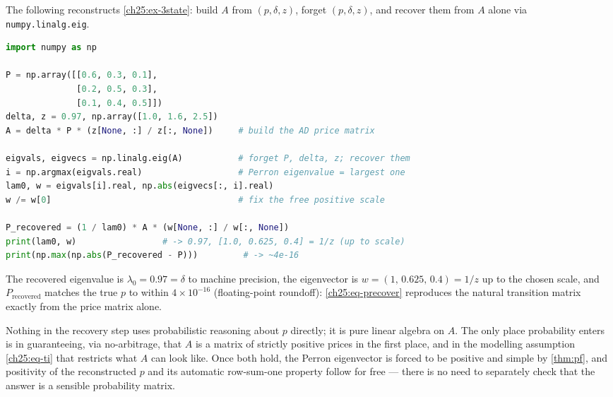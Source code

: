 \begin{paracol}{2}
\begin{casestudy}
The following reconstructs \cref{ch25:ex-3state}: build $A$ from $(p,\delta,z)$, forget $(p,\delta,z)$, and
recover them from $A$ alone via \texttt{numpy.linalg.eig}.
\begin{lstlisting}[language=Python]
import numpy as np

P = np.array([[0.6, 0.3, 0.1],
              [0.2, 0.5, 0.3],
              [0.1, 0.4, 0.5]])
delta, z = 0.97, np.array([1.0, 1.6, 2.5])
A = delta * P * (z[None, :] / z[:, None])     # build the AD price matrix

eigvals, eigvecs = np.linalg.eig(A)           # forget P, delta, z; recover them
i = np.argmax(eigvals.real)                   # Perron eigenvalue = largest one
lam0, w = eigvals[i].real, np.abs(eigvecs[:, i].real)
w /= w[0]                                     # fix the free positive scale

P_recovered = (1 / lam0) * A * (w[None, :] / w[:, None])
print(lam0, w)                 # -> 0.97, [1.0, 0.625, 0.4] = 1/z (up to scale)
print(np.max(np.abs(P_recovered - P)))         # -> ~4e-16
\end{lstlisting}
The recovered eigenvalue is $\lambda_0=0.97=\delta$ to machine precision, the eigenvector is
$w=(1,\,0.625,\,0.4)=1/z$ up to the chosen scale, and $P_{\mathrm{recovered}}$ matches the true $p$ to
within $4\times10^{-16}$ (floating-point roundoff): \cref{ch25:eq-precover} reproduces the natural
transition matrix exactly from the price matrix alone.
\end{casestudy}

\begin{intuition}
Nothing in the recovery step uses probabilistic reasoning about $p$ directly; it is pure linear algebra on
$A$. The only place probability enters is in guaranteeing, via no-arbitrage, that $A$ is a matrix of
strictly positive prices in the first place, and in the modelling assumption \eqref{ch25:eq-ti} that
restricts what $A$ can look like. Once both hold, the Perron eigenvector is forced to be positive and simple
by \cref{thm:pf}, and positivity of the reconstructed $p$ and its automatic row-sum-one property follow for
free --- there is no need to separately check that the answer is a sensible probability matrix.
\end{intuition}


\end{paracol}
